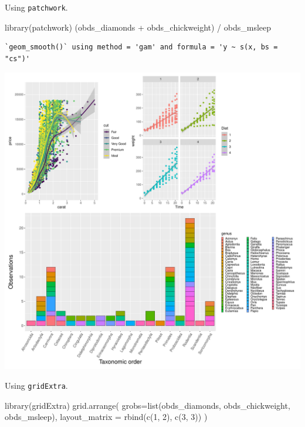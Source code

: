 \documentclass[
  letterpaper,
  DIV=11,
  numbers=noendperiod]{scrartcl}
\newenvironment{Shaded}{\begin{snugshade}}{\end{snugshade}}
\newcommand{\AttributeTok}[1]{\textcolor[rgb]{0.40,0.45,0.13}{#1}}
\newcommand{\DecValTok}[1]{\textcolor[rgb]{0.68,0.00,0.00}{#1}}
\newcommand{\FunctionTok}[1]{\textcolor[rgb]{0.28,0.35,0.67}{#1}}
\newcommand{\NormalTok}[1]{\textcolor[rgb]{0.00,0.23,0.31}{#1}}
\newcommand{\SpecialCharTok}[1]{\textcolor[rgb]{0.37,0.37,0.37}{#1}}
\begin{document}
Using \texttt{patchwork}.

\begin{Shaded}
\begin{Highlighting}[]
\FunctionTok{library}\NormalTok{(patchwork)}
\NormalTok{(obds\_diamonds }\SpecialCharTok{+}\NormalTok{ obds\_chickweight) }\SpecialCharTok{/}\NormalTok{ obds\_msleep}
\end{Highlighting}
\end{Shaded}

\begin{verbatim}
`geom_smooth()` using method = 'gam' and formula = 'y ~ s(x, bs = "cs")'
\end{verbatim}

\includegraphics{5-ggplot2_kevin_files/figure-pdf/unnamed-chunk-26-1.pdf}

Using \texttt{gridExtra}.

\begin{Shaded}
\begin{Highlighting}[]
\FunctionTok{library}\NormalTok{(gridExtra)}
\FunctionTok{grid.arrange}\NormalTok{(}
  \AttributeTok{grobs=}\FunctionTok{list}\NormalTok{(obds\_diamonds, obds\_chickweight, obds\_msleep),}
  \AttributeTok{layout\_matrix =} \FunctionTok{rbind}\NormalTok{(}\FunctionTok{c}\NormalTok{(}\DecValTok{1}\NormalTok{, }\DecValTok{2}\NormalTok{),}
                        \FunctionTok{c}\NormalTok{(}\DecValTok{3}\NormalTok{, }\DecValTok{3}\NormalTok{))}
\NormalTok{)}
\end{Highlighting}
\end{Shaded}
\end{document}
